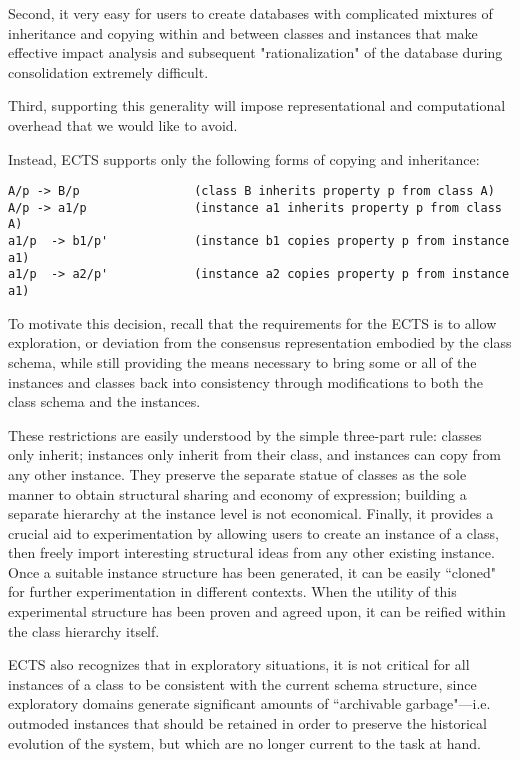 Second, it very easy for users to create databases with complicated mixtures of
inheritance and copying within and between classes and instances that make 
effective impact analysis and subsequent "rationalization" of the database
during consolidation extremely difficult.   

Third, supporting this generality will impose representational and computational
overhead that we would like to avoid.

Instead, ECTS supports only the following forms of copying and inheritance:

\small\begin{verbatim}
A/p -> B/p                (class B inherits property p from class A)
A/p -> a1/p               (instance a1 inherits property p from class A)
a1/p  -> b1/p'            (instance b1 copies property p from instance a1)
a1/p  -> a2/p'            (instance a2 copies property p from instance a1)
\end{verbatim}\normalsize

To motivate this decision, recall that the requirements for the ECTS is to allow
exploration, or deviation from the consensus representation embodied by the 
class schema, while still providing the means necessary to bring some or all of
the instances and classes back into consistency through modifications to both 
the class schema and the instances.

These restrictions are easily understood by the simple three-part rule: classes
only inherit; instances only inherit from their class, and instances can copy 
from any other instance.  They preserve the separate statue of classes as the 
sole manner to obtain structural sharing and economy of expression; building a 
separate hierarchy at the instance level is not economical.  Finally, it 
provides a crucial aid to experimentation by allowing users to create an 
instance of a class, then freely import interesting structural ideas from any 
other existing instance.  Once a suitable instance structure has been generated,
it can be easily ``cloned" for further experimentation in different contexts.  
When the utility of this experimental structure has been proven and agreed upon,
it can be reified within the class hierarchy itself.

ECTS also recognizes that in exploratory situations, it is not
critical for all instances of a class to be consistent with the
current schema structure, since exploratory domains generate
significant amounts of ``archivable garbage"---i.e. outmoded instances
that should be retained in order to preserve the historical evolution
of the system, but which are no longer current to the task at hand.

